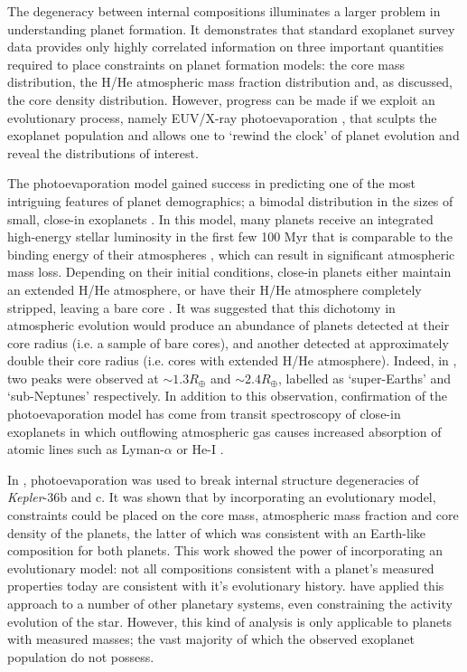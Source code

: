 \documentclass[fleqn,usenatbib]{mnras}
\begin{document}
The degeneracy between internal compositions illuminates a larger problem in understanding planet formation. It demonstrates that standard exoplanet survey data provides only highly correlated information on three important quantities required to place constraints on planet formation models: the core mass distribution, the H/He atmospheric mass fraction distribution and, as discussed, the core density distribution. However, progress can be made if we exploit an evolutionary process, namely EUV/X-ray photoevaporation \citep{Lammer2003,Baraffe2004,MurrayClay2009,Owen2013,Jin2014,LopezFortney2013,ChenRogers2016}, that sculpts the exoplanet population and allows one to `rewind the clock' of planet evolution and reveal the distributions of interest.

The photoevaporation model gained success in predicting one of the most intriguing features of planet demographics; a bimodal distribution in the sizes of small, close-in exoplanets \citep{Owen2013,LopezFortney2013}. In this model, many planets receive an integrated high-energy stellar luminosity in the first few 100 Myr \citep{Jackson2012} that is comparable to the binding energy of their atmospheres \citep{Lammer2003,Lecavelier2007,Davis2009}, which can result in significant atmospheric mass loss. Depending on their initial conditions, close-in planets either maintain an extended H/He atmosphere, or have their H/He atmosphere completely stripped, leaving a bare core \citep{Owen2017,Owen2019}. It was suggested that this dichotomy in atmospheric evolution would produce an abundance of planets detected at their core radius (i.e. a sample of bare cores), and another detected at approximately double their core radius (i.e. cores with extended H/He atmosphere). Indeed, in \cite{Fulton2017,VanEylen2018}, two peaks were observed at $\sim1.3 R_{\oplus}$ and $\sim 2.4 R_{\oplus}$, labelled as `super-Earths' and `sub-Neptunes' respectively. In addition to this observation, confirmation of the photoevaporation model has come from transit spectroscopy of close-in exoplanets in which outflowing atmospheric gas causes increased absorption of atomic lines such as Lyman-$\alpha$ or He-I \citep{VidalMadjar2003,Kulow2014,Ehrenreich2015,Spake2018}. 

In \cite{OwenMorton2016}, photoevaporation was used to break internal structure degeneracies of \textit{Kepler}-36b and c. It was shown that by incorporating an evolutionary model, constraints could be placed on the core mass, atmospheric mass fraction and core density of the planets, the latter of which was consistent with an Earth-like composition for both planets. This work showed the power of incorporating an evolutionary model: not all compositions consistent with a planet's measured properties today are consistent with it's evolutionary history. \citet{Kubyshkina2019b,Kubyshkina2019a} have applied this approach to a number of other planetary systems, even constraining the activity evolution of the star. However, this kind of analysis is only applicable to planets with measured masses; the vast majority of which the observed exoplanet population do not possess.
\end{document}
